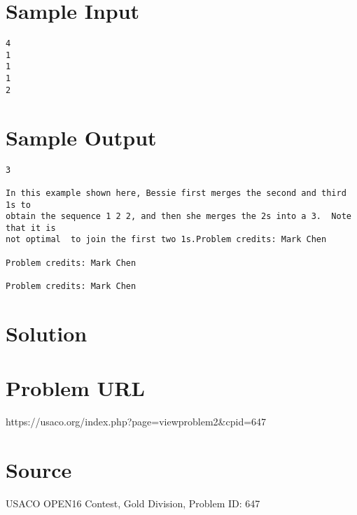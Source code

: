 \documentclass[12pt]{article}
\begin{document}
\section*{Sample Input}
\begin{verbatim}
4
1
1
1
2
\end{verbatim}

\section*{Sample Output}
\begin{verbatim}
3

In this example shown here, Bessie first merges the second and third 1s to
obtain the sequence 1 2 2, and then she merges the 2s into a 3.  Note that it is
not optimal  to join the first two 1s.Problem credits: Mark Chen

Problem credits: Mark Chen

Problem credits: Mark Chen
\end{verbatim}

\section*{Solution}


\section*{Problem URL}
https://usaco.org/index.php?page=viewproblem2&cpid=647

\section*{Source}
USACO OPEN16 Contest, Gold Division, Problem ID: 647
\end{document}
